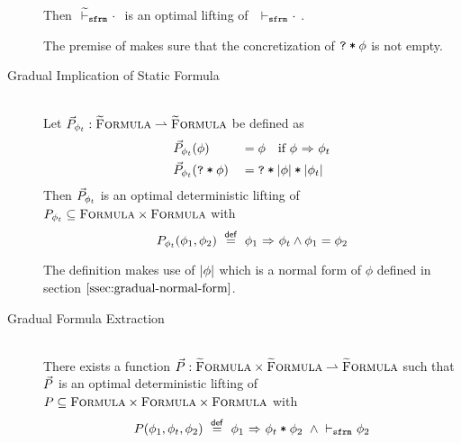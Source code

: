 \begin{description}
\begin{lemma}
        Then $~{\widetilde{\vdash}_\texttt{sfrm}}\,\, \cdot~$ is an optimal lifting of $~\,\,{\vdash_\texttt{sfrm}}\,\, \cdot~$.
    \end{lemma}
    The premise of  makes sure that the concretization of $\textup{\texttt{\textup{\texttt{?}}\:*\:\ensuremath{\phi}}}$ is not empty.
    
    \item[Gradual Implication of Static Formula]
    \begin{lemma}\label{lemma:impl-gimpl}~\\
        Let $\vec{P}_{\phi_t} : \textup{\textsc{\ensuremath{\widetilde{\text{F}}}ormula}} \rightharpoonup \textup{\textsc{\ensuremath{\widetilde{\text{F}}}ormula}}$ be defined as
        \begin{alignat*}{2}
        & \vec{P}_{\phi_t}(\phi)          & &= \phi  \quad\text{if } {\phi} \,\,{\Rightarrow}\,\, {\phi_t} \\
        & \vec{P}_{\phi_t}(\textup{\texttt{\textup{\texttt{?}}\:*\:\ensuremath{\phi}}}) & &= \textup{\texttt{\textup{\texttt{?}}\:*\:\ensuremath{\textup{\texttt{\ensuremath{|\phi|}\:*\:\ensuremath{|\phi_t|}}}}}}
        \end{alignat*}
        Then $\vec{P}_{\phi_t}$ is an optimal deterministic lifting of $P_{\phi_t} \subseteq \textup{\textsc{Formula}} \times \textup{\textsc{Formula}}$ with
        $$P_{\phi_t}(\phi_1, \phi_2) ~\overset{\textup{\textmd{\textsf{def}}}}{=}~ {\phi_1} \,\,{\Rightarrow}\,\, {\phi_t} \wedge \phi_1 = \phi_2$$
    \end{lemma}
    The definition makes use of $|\phi|$ which is a normal form of $\phi$ defined in section $\ref{ssec:gradual-normal-form}$.
    
    \item[Gradual Formula Extraction]
    \begin{lemma}\label{lemma:frm-extr}~\\
        There exists a function $\vec{P} : \textup{\textsc{\ensuremath{\widetilde{\text{F}}}ormula}} \times \textup{\textsc{\ensuremath{\widetilde{\text{F}}}ormula}} \rightharpoonup \textup{\textsc{\ensuremath{\widetilde{\text{F}}}ormula}}$ such that
        $\vec{P}$ is an optimal deterministic lifting of $P \subseteq \textup{\textsc{Formula}} \times \textup{\textsc{Formula}} \times \textup{\textsc{Formula}}$ with
        $$P(\phi_1, \phi_t, \phi_2) ~\overset{\textup{\textmd{\textsf{def}}}}{=}~ {\phi_1} \,\,{\Rightarrow}\,\, {\textup{\texttt{$\phi_t$\:*\:$\phi_2$}}} ~\wedge \,\,{\vdash_\texttt{sfrm}}\,\, \phi_2$$
    \end{lemma}
    
    \begin{comment}
    Formula extraction is dual to the separating conjunction in a sense that it weakens given formula $\phi_1$ enough (yielding formula $\phi_2$) such that $\phiImplies{\phi_1}{\phiCons{$\phi_t$}{$\phi_2$}}$ holds for some $\phi_r$.\\
    Note that this operation requires that $\phiImplies{\phi_1}{\phi_t}$ holds, otherwise it is undefined.
    
    The operation would have no meaning in a classical setting because $\phiImplies{\phi_1}{\phiAnd{$\phi_t$}{$\phi_1$}}$ holds, i.e. $\phi_1$ does not require any weakening in order to be implied together with another conjunctive term.
    However the linear nature of implicit dynamic frames requires that $\phi_2$ and $\phi_t$ give access to disjoint memory locations.
    \end{comment}
    

\end{description}
